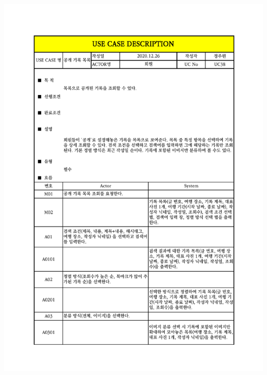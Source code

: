 {{{{{{{{{{{{{{{{{{{{{{{{{{{{{{{{{{{{{{{{\includegraphics[width=1.1\textwidth]{./Figure/Design/Display/usecase/038-1.pdf} \\
}}}}}}}}}}}}}}}}}}}}}}}}}}}}}}}}}}}}}}}}

